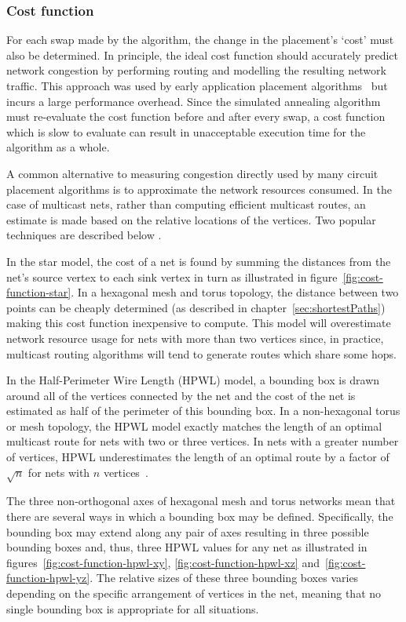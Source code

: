 			\subsubsection{Cost function}
				
				For each swap made by the algorithm, the change in the placement's
				`cost' must also be determined. In principle, the ideal cost function
				should accurately predict network congestion by performing routing and
				modelling the resulting network traffic. This approach was used by
				early application placement algorithms~\cite{steele85} but incurs a
				large performance overhead. Since the simulated annealing algorithm
				must re-evaluate the cost function before and after every swap, a cost
				function which is slow to evaluate can result in unacceptable execution
				time for the algorithm as a whole.
				
				A common alternative to measuring congestion directly used by many
				circuit placement algorithms is to approximate the network resources
				consumed. In the case of multicast nets, rather than computing
				efficient multicast routes, an estimate is made based on the relative
				locations of the vertices. Two popular techniques are described below
				\cite[\S4.2]{kahng11}.
				
				In the star model, the cost of a net is found by summing the distances
				from the net's source vertex to each sink vertex in turn as illustrated
				in figure~\ref{fig:cost-function-star}. In a hexagonal mesh and torus
				topology, the distance between two points can be cheaply determined (as
				described in chapter~\ref{sec:shortestPaths}) making this cost function
				inexpensive to compute. This model will overestimate network resource
				usage for nets with more than two vertices since, in practice,
				multicast routing algorithms will tend to generate routes which share
				some hops.
				
				In the Half-Perimeter Wire Length (HPWL) model, a bounding box is drawn
				around all of the vertices connected by the net and the cost of the net
				is estimated as half of the perimeter of this bounding box. In a
				non-hexagonal torus or mesh topology, the HPWL model exactly matches
				the length of an optimal multicast route for nets with two or three
				vertices. In nets with a greater number of vertices, HPWL
				underestimates the length of an optimal route by a factor of $\sqrt{n}$
				for nets with $n$ vertices~\cite{chung79}.
				
				The three non-orthogonal axes of hexagonal mesh and torus networks mean
				that there are several ways in which a bounding box may be defined.
				Specifically, the bounding box may extend along any pair of axes
				resulting in three possible bounding boxes and, thus, three HPWL values
				for any net as illustrated in figures~\ref{fig:cost-function-hpwl-xy},
				\ref{fig:cost-function-hpwl-xz} and~\ref{fig:cost-function-hpwl-yz}.
				The relative sizes of these three bounding boxes varies depending on
				the specific arrangement of vertices in the net, meaning that no single
				bounding box is appropriate for all situations.
				
